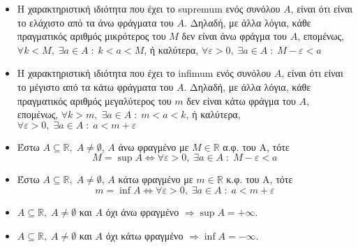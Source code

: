 \begin{rem}
\item {}
    \begin{itemize}[label=\textcolor{Col1}{\tiny$\blacksquare$}]
        \item 
    Η χαρακτηριστική ιδιότητα που έχει το supremum ενός συνόλου $ A $, είναι
    ότι είναι το ελάχιστο από τα άνω φράγματα του $A$. Δηλαδή, με άλλα λόγια,
    κάθε πραγματικός αριθμός μικρότερος του $M$ δεν είναι άνω φράγμα του 
    $A$, επομένως, $ \forall k < M, \; \exists a \in A \; : \; k < a < M $, 
    ή καλύτερα, $ \forall \varepsilon > 0, \; \exists a \in A \; : \; 
    M- \varepsilon < a$

\item 
    Η χαρακτηριστική ιδιότητα που έχει το infimum ενός συνόλου $ A $, είναι
    ότι είναι το μέγιστο από τα κάτω φράγματα του $A$. Δηλαδή, με άλλα λόγια,
    κάθε πραγματικός αριθμός μεγαλύτερος του $m$ δεν είναι κάτω φράγμα του 
    $A$, επομένως, $ \forall k > m, \; \exists a \in A \; : \; m < a < k $, 
    ή καλύτερα, $ \forall \varepsilon > 0, \; \exists a \in A \; : \; 
    a < m + \varepsilon $
    \end{itemize}
\end{rem}
\begin{thm}[\textcolor{Col2}{Χαρακτηριστική ιδιότητα του sup και inf}]
\item {}
    \begin{itemize}[label=\textcolor{Col1}{\tiny$\blacksquare$}]
        \item Έστω $ A \subseteq \mathbb{R}, \; A \neq \emptyset $, $ A $ άνω φραγμένο με $M \in \mathbb{R}$ α.φ. του A, τότε 
    \[
         M = \sup A \Leftrightarrow \forall \varepsilon > 0, \; \exists 
         a \in A \; : \; M- \varepsilon  < a
     \] 

 \item Έστω $ A \subseteq \mathbb{R}, \; A \neq \emptyset $, $ A $ κάτω
    φραγμένο με $m \in \mathbb{R}$ κ.φ. του A, τότε 
    \[
         m = \inf A \Leftrightarrow \forall \varepsilon > 0, \; \exists 
         a \in A \; : \; a < m+ \varepsilon 
     \] 
    \end{itemize}
    \end{thm}

\begin{prop}
        \item {}
    \begin{itemize}[label=\textcolor{Col1}{\tiny$\blacksquare$}]
        \item $ A \subseteq \mathbb{R}, \; A \neq \emptyset $ και $A$ όχι 
            άνω φραγμένο $ \Rightarrow \sup A = + \infty $.
        \item $ A \subseteq \mathbb{R}, \; A \neq \emptyset $ και $A$ όχι 
            κάτω φραγμένο $ \Rightarrow \inf A = - \infty $.
    \end{itemize}

    

\end{prop}

